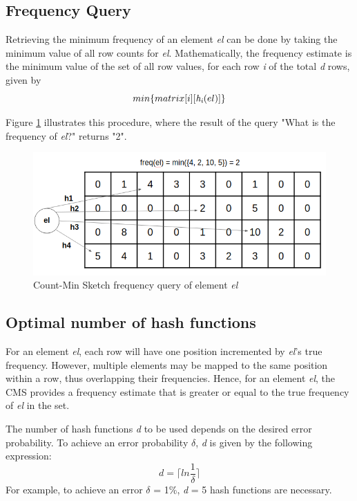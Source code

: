 \subsection*{Frequency Query}
Retrieving the minimum frequency of an element \textit{el} can be done by taking the minimum value of all row counts for \textit{el}. Mathematically, the frequency estimate is the minimum value of the set of all row values, for each row \textit{i} of the total \textit{d} rows, given by
\[ min \{matrix[i][\textit{h\textsubscript{i}}(el)]\} \]

Figure \ref{fig:query-cms} illustrates this procedure, where the result of the query "What is the frequency of \textit{el}?" returns "2".
   
\begin{figure}[!htb]
    \begin{center}
      \includegraphics[scale=0.5]{figures/query-cms.png}
      \caption[Count-Min Sketch frequency query]{Count-Min Sketch frequency query of element \textit{el}}
      \label{fig:query-cms}
    \end{center}
\end{figure}

\subsection*{Optimal number of hash functions} 
For an element \textit{el}, each row will have one position incremented by \textit{el}'s true frequency. However, multiple elements may be mapped to the same position within a row, thus overlapping their frequencies. Hence, for an element \textit{el}, the CMS provides a frequency estimate that is greater or equal to the true frequency of \textit{el} in the set.

The number of hash functions \textit{d} to be used depends on the desired error probability. To achieve an error probability $\delta$, \textit{d} is given by the following expression:
\begin{equation}
    d = \lceil ln \frac{1}{\delta} \rceil
\end{equation}
For example, to achieve an error $\delta$ = 1\%, \textit{d} = 5 hash functions are necessary.

